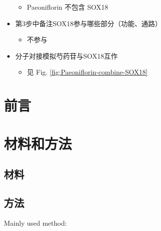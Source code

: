 \documentclass[
]{article}
\providecommand{\tightlist}{%
  \setlength{\itemsep}{0pt}\setlength{\parskip}{0pt}}
\begin{document}
\begin{itemize}
  \begin{itemize}
  \tightlist
  \item
    Paeoniflorin 不包含 SOX18
  \end{itemize}
\item
  第3步中备注SOX18参与哪些部分（功能、通路）

  \begin{itemize}
  \tightlist
  \item
    不参与
  \end{itemize}
\item
  分子对接模拟芍药苷与SOX18互作

  \begin{itemize}
  \tightlist
  \item
    见 Fig. \ref{fig:Paeoniflorin-combine-SOX18}
  \end{itemize}
\end{itemize}

\hypertarget{introduction}{%
\section{前言}\label{introduction}}

\hypertarget{methods}{%
\section{材料和方法}\label{methods}}

\hypertarget{ux6750ux6599}{%
\subsection{材料}\label{ux6750ux6599}}

\hypertarget{ux65b9ux6cd5}{%
\subsection{方法}\label{ux65b9ux6cd5}}

Mainly used method:
\end{document}
